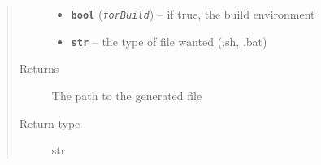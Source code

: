 \documentclass[a4paper,10pt,english]{sphinxmanual}
\begin{document}
\begin{fulllineitems}
\begin{fulllineitems}
\begin{quote}
\begin{description}
\begin{itemize}
\item {} 
\textbf{\texttt{bool}} (\emph{\texttt{forBuild}}) -- if true, the build environment

\item {} 
\textbf{\texttt{str}} -- the type of file wanted (.sh, .bat)

\end{itemize}

\item[{Returns}] \leavevmode
The path to the generated file

\item[{Return type}] \leavevmode
str

\end{description}\end{quote}

\end{fulllineitems}


\end{fulllineitems}

\end{document}
